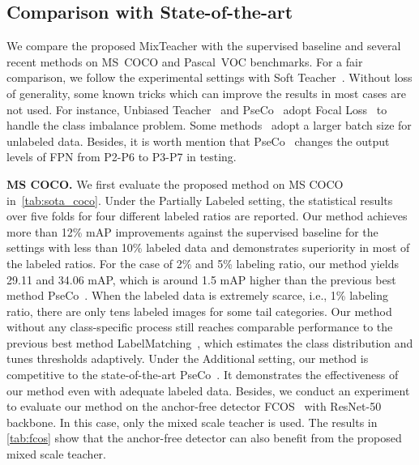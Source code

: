 \documentclass[10pt,twocolumn,letterpaper]{article}
\begin{document}
\subsection{Comparison with State-of-the-art}

We compare the proposed MixTeacher with the supervised baseline and several recent methods on MS~COCO and Pascal~VOC benchmarks. For a fair comparison, we follow the experimental settings with Soft Teacher~\cite{softTeacher}. 
Without loss of generality, some known tricks which can improve the results in most cases are not used. For instance, Unbiased Teacher~\cite{unbiasedTeacher} and PseCo~\cite{pseco} adopt Focal Loss~\cite{focal} to handle the class imbalance problem. Some methods~\cite{LabelMatching, unbiasedTeacher} adopt a larger batch size for unlabeled data. Besides, it is worth mention that PseCo~\cite{pseco} changes the output levels of FPN from P2-P6 to P3-P7 in testing.

\vspace{.5em}
\noindent \textbf{MS COCO.} We first evaluate the proposed method on MS COCO in~\cref{tab:sota_coco}. Under the Partially Labeled setting, the statistical results over five folds for four different labeled ratios are reported. Our method achieves more than 12\% mAP improvements against the supervised baseline for the settings with less than 10\% labeled data and demonstrates superiority in most of the labeled ratios. 
For the case of 2\% and 5\% labeling ratio, our method yields 29.11 and 34.06 mAP, which is around 1.5 mAP higher than the previous best method PseCo~\cite{pseco}. When the labeled data is extremely scarce, i.e., 1\% labeling ratio, there are only tens labeled images for some tail categories. Our method without any class-specific process still reaches comparable performance to the previous best method LabelMatching~\cite{LabelMatching}, which estimates the class distribution and tunes thresholds adaptively. Under the Additional setting, our method is competitive to the state-of-the-art PseCo~\cite{pseco}. It demonstrates the effectiveness of our method even with adequate labeled data. Besides, we conduct an experiment to evaluate our method on the anchor-free detector FCOS~\cite{fcos} with ResNet-50 backbone. In this case, only the mixed scale teacher is used. The results in \cref{tab:fcos} show that the anchor-free detector can also benefit from the proposed mixed scale teacher. 
\end{document}
